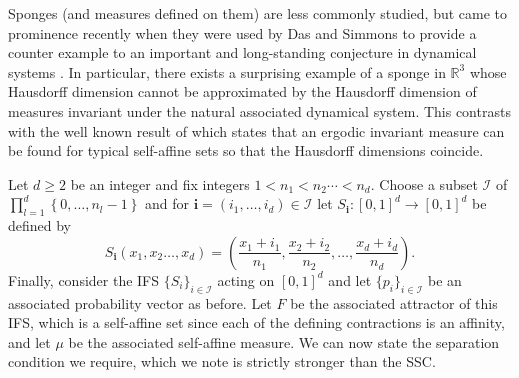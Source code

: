 Sponges (and measures defined on them) are less commonly studied, but came to prominence recently when they were used by Das and Simmons to provide a counter example to an important and long-standing conjecture in dynamical systems \cite{das-simmons}. In particular, there exists a surprising example of a sponge in $\mathbb{R}^3$ whose Hausdorff dimension cannot be approximated by the Hausdorff dimension of measures invariant under the natural associated dynamical system. This contrasts with the well known result of \cite{kaenmaki-ON-NATURAL-INVARIANT-MEASURES-ON-GENERALISED-ITERATED-FUNCTION-SYSTEMS} which states that an ergodic invariant measure can be found for typical self-affine sets so that the Hausdorff dimensions coincide.


Let $d \geq 2$ be an integer and fix integers $1<n_1 < n_2 \cdots < n_d$.  Choose a subset $\mathcal{I}$ of $\prod_{l=1}^{d} \left\lbrace 0,\ldots, n_l-1 \right\rbrace$ and for $\textbf{i}=(i_1, \ldots, i_d)\in \mathcal{I} $  let $S_{\textbf{i}} \colon [0,1]^d \rightarrow [0,1]^d$ be defined by
\[
S_{\textbf{i}}(x_1,x_2\ldots, x_d)= \left( \frac{x_1+i_1}{n_1}, \frac{x_2+i_2}{n_2}, \ldots, \frac{x_d+i_d}{n_d} \right) .
\]
Finally, consider the IFS $\{S_i\}_{i \in \mathcal{I}}$  acting on $[0,1]^d$ and let $\{p_i\}_{i \in \mathcal{I}}$ be an associated probability vector as before.  Let $F$ be the associated attractor of this IFS, which is a self-affine set since each of the defining contractions is an affinity, and let $\mu$ be the associated self-affine measure.  We can now state the separation condition we require, which we note is strictly stronger than the SSC.


